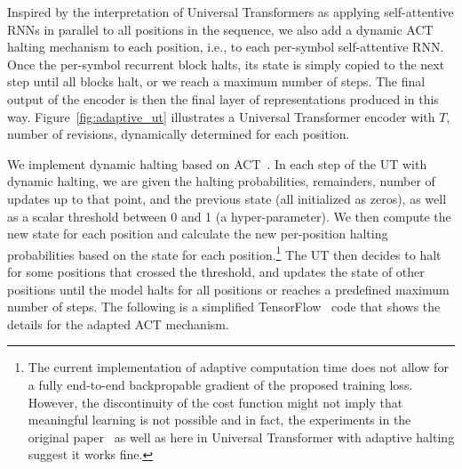 Inspired by the interpretation of Universal Transformers as applying self-attentive RNNs in parallel to all positions in the sequence, we also add a dynamic ACT halting mechanism to each position, i.e., to each per-symbol self-attentive RNN. Once the per-symbol recurrent block halts, its state is simply copied to the next step until all blocks halt, or we reach a maximum number of steps. The final output of the encoder is then the final layer of representations produced in this way. Figure~\ref{fig:adaptive_ut} illustrates a Universal Transformer encoder with $T$, number of revisions, dynamically determined for each position.


We implement dynamic halting based on ACT~\citep{graves2016adaptive}. In each step of the UT with dynamic halting, we are given the halting probabilities, remainders, number of updates up to that point, and the previous state (all initialized as zeros), as well as a scalar threshold between 0 and 1 (a hyper-parameter). We then compute the new state for each position and calculate the new per-position halting probabilities based on the state for each position.\footnote{The current implementation of adaptive computation time does not allow for a fully end-to-end backpropable gradient of the proposed training loss. However, the discontinuity of the cost function might not imply that meaningful learning is not possible and in fact, the experiments in the original paper~\citep{graves2016adaptive} as well as here in Universal Transformer with adaptive halting suggest it works fine.} The UT then decides to halt for some positions that crossed the threshold, and updates the state of other positions until the model halts for all positions or reaches a predefined maximum number of steps. 
The following is a simplified TensorFlow~\citep{tensorflow2015-whitepaper} code that shows the details for the adapted ACT mechanism.



